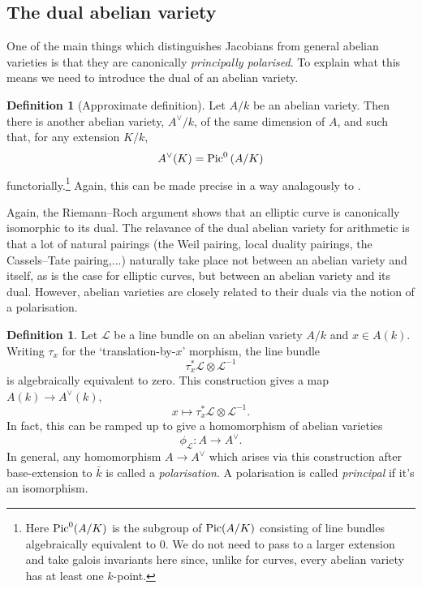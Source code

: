 \documentclass[12pt]{amsart}
\numberwithin{equation}{section}
\theoremstyle{remark}
\theoremstyle{definition}
\theoremstyle{definition}
\theoremstyle{definition}
\newtheorem{defi}[equation]{Definition}
\theoremstyle{definition}
\theoremstyle{definition}
\theoremstyle{definition}
\begin{document}
\subsection{The dual abelian variety}

One of the main things which distinguishes Jacobians from general abelian varieties is that they are canonically \textit{principally polarised}. To explain what this means we need to introduce the dual of an abelian variety. 

\begin{defi}[Approximate definition]
Let $A/k$ be an abelian variety. Then there is another abelian variety, $A^\vee/k$, of the same dimension of $A$, and such that, for any extension $K/k$, \[A^\vee(K)=\textup{Pic}^0\left(A/K\right)\]
functorially.\footnote{Here $\textup{Pic}^0(A/K)$ is the subgroup of $\textup{Pic}(A/K)$ consisting of line bundles algebraically equivalent to $0$. We do not need to  pass to a larger extension and  take galois invariants here since, unlike for curves, every abelian variety has at least one $k$-point.}  Again, this can be made precise in a way analagously to .
\end{defi}

Again, the Riemann--Roch argument shows that an elliptic curve is canonically isomorphic to its dual. The relavance of the dual abelian variety for arithmetic is that a lot of natural pairings (the Weil pairing, local duality pairings, the Cassels--Tate pairing,...) naturally take place not between an abelian variety and itself, as is the case for elliptic curves, but between an abelian variety and its dual. However, abelian varieties are closely related to their duals via the notion of a polarisation. 

\begin{defi}
Let $\mathcal{L}$ be a line bundle on an abelian variety $A/k$ and $x\in A(k)$. Writing $\tau_x$ for the `translation-by-$x$' morphism, the line bundle 
\[\tau^*_x\mathcal{L}\otimes \mathcal{L}^{-1}\]
is algebraically equivalent to zero. This construction gives a map $A(k)\rightarrow A^\vee(k)$, 
\[x \longmapsto \tau^*_x\mathcal{L}\otimes \mathcal{L}^{-1}.\]
 In fact, this can be ramped up to give a homomorphism of abelian varieties 
\[\phi_\mathcal{L}:A\longrightarrow A^\vee.\]
In general, any homomorphism $A\rightarrow A^\vee$ which arises via this construction after base-extension to $\bar{k}$ is called a \textit{polarisation}.
A polarisation is called \textit{principal} if it's an isomorphism.
\end{defi}  
\end{document}
